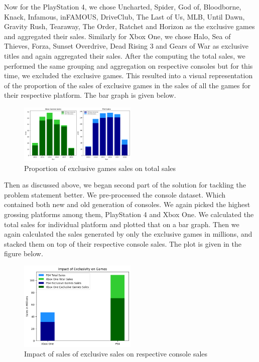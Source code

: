 \documentclass[conference]{IEEEtran}
\begin{document}
Now for the PlayStation 4, we chose Uncharted, Spider, God of, Bloodborne, Knack, Infamous, inFAMOUS, DriveClub, The Last of Us, MLB, Until Dawn, Gravity Rush, Tearaway, The Order, Ratchet and Horizon as the exclusive games and aggregated their sales. Similarly for Xbox One, we chose Halo, Sea of Thieves, Forza, Sunset Overdrive, Dead Rising 3 and Gears of War as exclusive titles and again aggregated their sales. After the computing the total sales, we performed the same grouping and aggregation on respective consoles but for this time, we excluded the exclusive games. This resulted into a visual representation of the proportion of the sales of exclusive games in the sales of all the games for their respective platform. The bar graph is given below.\\
\begin{figure}[h]
    \centering
    \includegraphics[width=0.5\textwidth]{excl1.png}
    \caption{Proportion of exclusive games sales on total sales}
\end{figure}
Then as discussed above, we began second part of the solution for tackling the problem statement better. We pre-processed the console dataset. Which contained both new and old generation of consoles. We again picked the highest grossing platforms among them, PlayStation 4 and Xbox One. We calculated the total sales for individual platform and plotted that on a bar graph. Then we again calculated the sales generated by only the exclusive games in millions, and stacked them on top of their respective console sales. The plot is given in the figure below.\\
\begin{figure}[h]
    \centering
    \includegraphics[width=0.5\textwidth]{excl2.png}
    \caption{Impact of sales of exclusive sales on respective console sales}
\end{figure}
\end{document}
